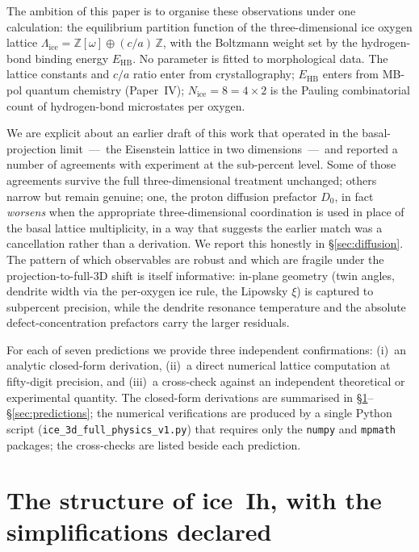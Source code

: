\documentclass[final]{siamltex}
\newcommand{\EHB}{E_{\mathrm{HB}}}
\newcommand{\Nrule}{N_{\mathrm{ice}}}
\newcommand{\Z}{\mathbb{Z}}
\newcommand{\Eisenstein}{\mathbb{Z}[\omega]}
\newcommand{\IceLat}{\Lambda_{\mathrm{ice}}}
\begin{document}
The ambition of this paper is to organise these observations under
one calculation: the equilibrium partition function of the three-dimensional
ice oxygen lattice $\IceLat = \Eisenstein \oplus (c/a)\,\Z$, with
the Boltzmann weight set by the hydrogen-bond binding energy
$\EHB$.  No parameter is fitted to morphological data.  The lattice
constants and $c/a$ ratio enter from crystallography; $\EHB$
enters from MB-pol quantum chemistry (Paper~IV);
$\Nrule = 8 = 4 \times 2$ is the Pauling combinatorial count of
hydrogen-bond microstates per oxygen.

We are explicit about an earlier draft of this work that operated
in the basal-projection limit~---~the Eisenstein lattice in two
dimensions~---~and reported a number of agreements with experiment
at the sub-percent level.  Some of those agreements survive the
full three-dimensional treatment unchanged; others narrow but
remain genuine; one, the proton diffusion prefactor $D_0$, in fact
\emph{worsens} when the appropriate three-dimensional coordination
is used in place of the basal lattice multiplicity, in a way that
suggests the earlier match was a cancellation rather than a
derivation.  We report this honestly in
\S\ref{sec:diffusion}.  The pattern of which observables are
robust and which are fragile under the projection-to-full-3D shift
is itself informative: in-plane geometry (twin angles, dendrite
width via the per-oxygen ice rule, the Lipowsky $\xi$) is captured
to subpercent precision, while the dendrite resonance temperature
and the absolute defect-concentration prefactors carry the larger
residuals.

For each of seven predictions we provide three independent
confirmations: (i)~an analytic closed-form derivation,
(ii)~a direct numerical lattice computation at fifty-digit precision,
and (iii)~a cross-check against an independent theoretical or
experimental quantity.  The closed-form derivations are summarised
in \S\ref{sec:setup}--\S\ref{sec:predictions}; the numerical
verifications are produced by a single Python script
(\texttt{ice\_3d\_full\_physics\_v1.py}) that requires only the
\texttt{numpy} and \texttt{mpmath} packages; the cross-checks are
listed beside each prediction.

\section{The structure of ice~Ih, with the simplifications declared}
\label{sec:setup}
\end{document}
